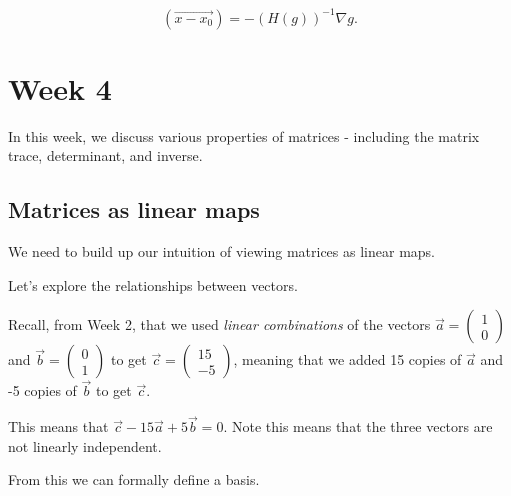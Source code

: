 \documentclass[a4paper, 12pt,oneside,openany]{book}
\begin{document}
$$(\overrightarrow{x-x_0}) = -(H(g))^{-1} \nabla g.$$

\chapter{Week 4}

In this week, we discuss various properties of matrices - including the matrix trace, determinant, and inverse.

\section{Matrices as linear maps}

We need to build up our intuition of viewing matrices as linear maps. 


Let's explore the relationships between vectors.


Recall, from Week 2, that we used \emph{linear combinations} of the vectors $\vec{a}= \begin{pmatrix} 1 \\ 0 \end{pmatrix}$ and $\vec{b}=\begin{pmatrix} 0 \\ 1 \end{pmatrix}$ to get $\vec{c}=\begin{pmatrix} 15 \\ -5 \end{pmatrix}$, meaning that we added 15 copies of $\vec{a}$ and -5 copies of $\vec{b}$ to get $\vec{c}$. 

This means that $\vec{c}-15\vec{a}+5\vec{b}=0$. Note this means that the three vectors are not linearly independent.

From this we can formally define a basis.
\end{document}
